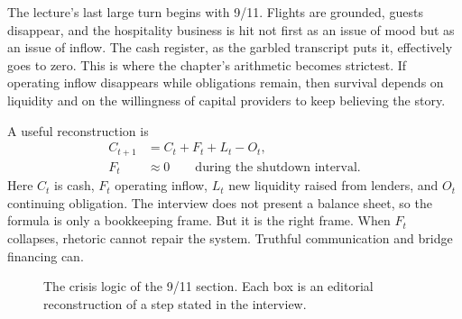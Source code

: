 The lecture's last large turn begins with 9/11. Flights are grounded, guests disappear, and the hospitality business is hit not first as an issue of mood but as an issue of inflow. The cash register, as the garbled transcript puts it, effectively goes to zero. This is where the chapter's arithmetic becomes strictest. If operating inflow disappears while obligations remain, then survival depends on liquidity and on the willingness of capital providers to keep believing the story.

A useful reconstruction is
\begin{align}
C_{t+1} &= C_t + F_t + L_t - O_t,\\
F_t &\approx 0 \qquad \text{during the shutdown interval.}
\end{align}
Here \(C_t\) is cash, \(F_t\) operating inflow, \(L_t\) new liquidity raised from lenders, and \(O_t\) continuing obligation. The interview does not present a balance sheet, so the formula is only a bookkeeping frame. But it is the right frame. When \(F_t\) collapses, rhetoric cannot repair the system. Truthful communication and bridge financing can.

\begin{figure}[h]
\centering
{}
\caption{The crisis logic of the 9/11 section. Each box is an editorial reconstruction of a step stated in the interview.}
\end{figure}

